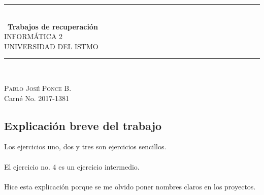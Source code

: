 \documentclass[12pt]{extreport}
\newcommand{\horrule}[1]{\rule{\linewidth}{#1}}
\begin{document}
\begin{titlepage}
\begin{center}
\horrule{1pt}\\
[0.5cm]\
\huge{\textbf{Trabajos de recuperación}}\\
\textsc{\large INFORMÁTICA 2}\\
\textsc{\large UNIVERSIDAD DEL ISTMO}\\
[0.02cm]
\horrule{1pt}\\
[12.5cm]
\end{center}
\begin{flushright}
\textsc{\large Pablo José Ponce B.}\\
Carné No. 2017-1381
\end{flushright}
\end{titlepage}

%
%

\begin{center}
\section*{Explicación breve del trabajo}
\end{center}
Los ejercicios uno, dos y tres son ejercicios sencillos.\\
\\
El ejercicio no. 4 es un ejercicio intermedio.\\
\\
Hice esta explicación porque se me olvido poner nombres claros en los proyectos.\\

\end{document}
